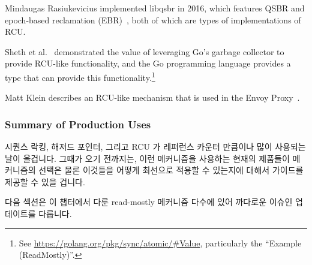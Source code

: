 Mindaugas Rasiukevicius implemented libqsbr in 2016, which features
QSBR and epoch-based reclamation
(EBR)~\cite{MindaugasRasiukevicius2016libqsbr},
both of which are types of implementations of RCU.

Sheth et al.~\cite{HarshalSheth2016goRCU}
demonstrated the value of leveraging Go's garbage
collector to provide RCU-like functionality, and
the Go programming language provides a  type that can
provide this functionality.\footnote{
	See \url{https://golang.org/pkg/sync/atomic/\#Value}, particularly
	the ``Example (ReadMostly)''.}

Matt Klein describes an RCU-like mechanism that is used in the Envoy
Proxy~\cite{MattKlein2017EnvoyRCU}.
\fi

\subsubsection{Summary of Production Uses}
\label{sec:defer:Summary of Production Uses}

시퀀스 락킹, 해저드 포인터, 그리고 RCU 가 레퍼런스 카운터 만큼이나 많이
사용되는 날이 올겁니다.
그때가 오기 전까지는, 이런 메커니즘을 사용하는 현재의 제품들이 메커니즘의
선택은 물론 이것들을 어떻게 최선으로 적용할 수 있는지에 대해서 가이드를 제공할
수 있을 겁니다.

다음 섹션은 이 챕터에서 다룬 read-mostly 메커니즘 다수에 있어 까다로운 이슈인
업데이트를 다룹니다.
\iffalse

Perhaps the time will come when sequence locking, hazard pointers, and
RCU are all as heavily used and as well known as are reference counters.
Until that time comes, the current production uses of these mechanisms
should help guide the choice of mechanism as well as showing how best
to apply each of them.

The next section discusses updates, a ticklish issue for many of the
read-mostly mechanisms described in this chapter.
\fi
